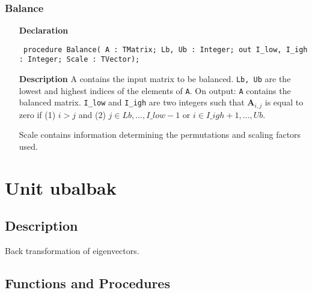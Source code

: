 \documentclass[12pt,a4paper,oneside]{report}
\newcommand{\declarationitem}[1]{\textbf{#1}}
\newcommand{\descriptiontitle}[1]{\textbf{#1}}
\newcommand{\code}[1]{\texttt{#1}}
\begin{document}
\subsubsection{Balance}
\label{ubalance-Balance}
\begin{itemize}\item[\declarationitem{Declaration}\hfill]
	\begin{flushleft}
		\code{
			procedure Balance( A : TMatrix; Lb, Ub : Integer; out I{\_}low, I{\_}igh : Integer; Scale : TVector);}
	\end{flushleft}
	\par
	\item[\descriptiontitle{Description}]
	A contains the input matrix to be balanced. \code{Lb, Ub} are the lowest and highest indices of the elements of \code{A}. On output: \code{A} contains the balanced matrix. \code{I{\_}low} and \code{I{\_}igh} are two integers such that $\textbf{A}_{i,j}$ is equal to zero if (1) $i > j$ and (2) $j \in Lb,\dots,I\!\_low{-}1$ or $i \in I\!\_igh+1,\dots,Ub$.
	
	Scale contains information determining the  permutations and scaling factors used.
	
\end{itemize}
\section{Unit ubalbak}
\label{ubalbak}
\subsection{Description}
Back transformation of eigenvectors. 
\subsection{Functions and Procedures}
\end{document}
